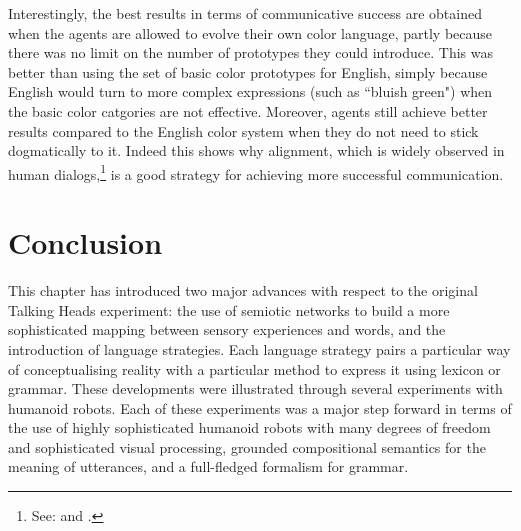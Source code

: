 Interestingly, the best results in terms of communicative success
are obtained when the agents are allowed to evolve their own color language, 
partly because there was no limit on the number of prototypes they could introduce. This was better 
than using the set of basic color prototypes for English, simply because English would turn to more complex expressions
(such as ``bluish green") when the basic color catgories are not effective. Moreover, 
agents still achieve better results compared to the English color system when they do not need to stick 
dogmatically to it. Indeed this shows why alignment, which is widely observed
in human dialogs,\footnote{See: \cite{Garrod:1987} and \cite{Galantucci:2005}.}
is a good strategy for achieving more successful communication. \\

\section{Conclusion}

This chapter has introduced two major advances with respect to the original Talking Heads experiment: 
the use of semiotic networks to build a more sophisticated mapping between sensory experiences and words, and the 
introduction of language strategies. Each language strategy pairs a particular way of conceptualising reality 
with a particular method to express it using lexicon or grammar. 
These developments were illustrated through several experiments with humanoid robots. Each of these experiments 
was a major step forward in terms of the use of 
highly sophisticated humanoid robots with many degrees of freedom and sophisticated visual processing, grounded compositional 
semantics for the meaning of utterances, and a full-fledged formalism for grammar. 


